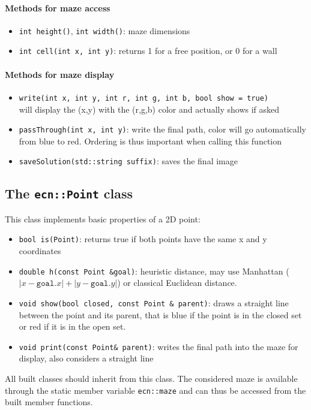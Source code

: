 \documentclass{ecnreport}
\begin{document}
\paragraph{Methods for maze access}
\begin{itemize}
 \item \texttt{int height()}, \texttt{int width()}: maze dimensions
 \item \texttt{int cell(int x, int y)}: returns 1 for a free position, or 0 for a wall
\end{itemize}

\paragraph{Methods for maze display}
\begin{itemize}
 \item \texttt{write(int x, int y, int r, int g, int b, bool show = true)}\\
    will display the (x,y) with the (r,g,b) color and actually shows if asked
 \item \texttt{passThrough(int x, int y)}: write the final path, color will go automatically from blue to red. 
 Ordering is thus important when calling this function
 \item \texttt{saveSolution(std::string suffix)}: saves the final image
\end{itemize}

\subsection{The \texttt{ecn::Point} class}\label{ptClass}

This class implements basic properties of a 2D point:

\begin{itemize}
 \item \texttt{bool is(Point)}: returns true if both points have the same x and y coordinates
 \item \texttt{double h(const Point \&goal)}: heuristic distance, may use Manhattan
 ($|x-\texttt{goal}.x| + |y-\texttt{goal}.y|$) or classical Euclidean distance.
 \item \texttt{void show(bool closed, const Point \& parent)}: draws a straight line between the point and its parent, that
 is blue if the point is in the closed set or red if it is in the open set.
 \item \texttt{void print(const Point\& parent)}: writes the final path into the maze for display, also considers a straight line
\end{itemize}
All built classes should inherit from this class. The considered maze is available through the static member variable \texttt{ecn::maze} and can thus
be accessed from the built member functions.
\end{document}
